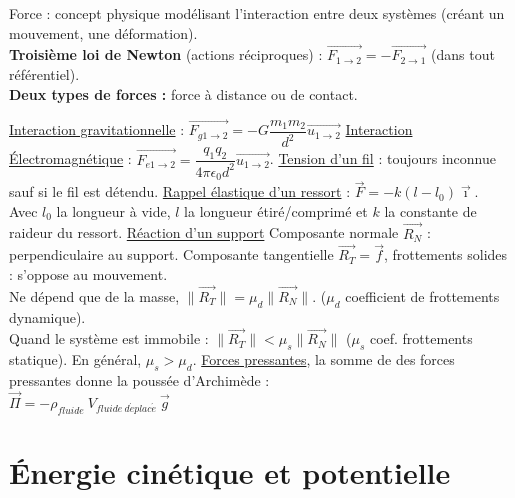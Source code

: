 \documentclass[13pt, twoside, a4paper, french]{report}
\begin{document}
            Force : concept physique modélisant l'interaction entre deux systèmes (créant un mouvement, une déformation).\\
            
            \textbf{Troisième loi de Newton} (actions réciproques) : $\overrightarrow{F_{1\rightarrow2}} = - \overrightarrow{F_{2\rightarrow1}}$ (dans tout référentiel).\\
            
            \textbf{Deux types de forces :} force à distance ou de contact.
            \begin{outline}
                \1 \underline{Interaction gravitationnelle} : $\overrightarrow{F_{g1\rightarrow2}} = - G\dfrac{m_1 m_2}{d^2}\overrightarrow{u_{1\rightarrow2}}$
                \1 \underline{Interaction Électromagnétique} : $\overrightarrow{F_{e1\rightarrow2}} = \dfrac{q_1 q_2}{4\pi\epsilon_0 d^2}\overrightarrow{u_{1\rightarrow2}}$.
                \1 \underline{Tension d'un fil} : toujours inconnue sauf si le fil est détendu.
                \1 \underline{Rappel élastique d'un ressort} : $\vec{F} = - k (l - l_0)\vec{\imath}$.\\Avec $l_0$ la longueur à vide, $l$ la longueur étiré/comprimé et $k$ la constante de raideur du ressort.
                \1 \underline{Réaction d'un support}
                \2 Composante normale $\overrightarrow{R_N}$ : perpendiculaire au support.
                \2 Composante tangentielle $\overrightarrow{R_T} = \overrightarrow{f}$, frottements solides : s'oppose au mouvement.\\Ne dépend que de la masse, $\|\overrightarrow{R_T}\| = \mu_d \|\overrightarrow{R_N}\|$. ($\mu_d$ coefficient de frottements dynamique).\\Quand le système est immobile : $\|\overrightarrow{R_T}\| < \mu_s \|\overrightarrow{R_N}\|$ ($\mu_s$ coef. frottements statique). En général, $\mu_s > \mu_d$.
                \1 \underline{Forces pressantes}, la somme de des forces pressantes donne la poussée d'Archimède :
                \\$\overrightarrow{\Pi} = - \rho_{fluide}\ V_{fluide \ d\acute eplac\acute e}\ \vec{g}$
            \end{outline}
    
    
    \section{Énergie cinétique et potentielle}\label{sec:energie-cinetique-et-potentielle}
        
\end{document}
